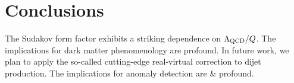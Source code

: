 \section{Conclusions}\label{sec:conclusions}

The Sudakov form factor exhibits a striking dependence on $\Lambda_{\rm
QCD}/Q$. The implications for dark matter phenomenology are profound. In
future work, we plan to apply the so-called cutting-edge real-virtual
correction to dijet production. The implications for anomaly detection
are & profound.

